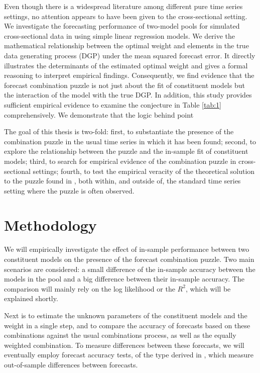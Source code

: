 \documentclass{monashthesis}
\begin{document}
Even though there is a widespread literature among different pure time series settings, no attention appears to have been given to the cross-sectional setting. We investigate the forecasting performance of two-model pools for simulated cross-sectional data in using simple linear regression models. We derive the mathematical relationship between the optimal weight and elements in the true data generating process (DGP) under the mean squared forecast error. It directly illustrates the determinants of the estimated optimal weight and gives a formal reasoning to interpret empirical findings. Consequently, we find evidence that the forecast combination puzzle is not just about the fit of constituent models but the interaction of the model with the true DGP. In addition, this study provides sufficient empirical evidence to examine the conjecture in Table \ref{tab:1} comprehensively. We demonstrate that the logic behind point

The goal of this thesis is two-fold: first, to substantiate the presence of the combination puzzle in the usual time series in which it has been found; second, to explore the relationship between the puzzle and the in-sample fit of constituent models; third, to search for empirical evidence of the combination puzzle in cross-sectional settings; fourth, to test the empirical veracity of the theoretical solution to the puzzle found in \textcite{FZMP23}, both within, and outside of, the standard time series setting where the puzzle is often observed.

\hypertarget{method}{%
\chapter{Methodology}\label{method}}

We will empirically investigate the effect of in-sample performance between two constituent models on the presence of the forecast combination puzzle. Two main scenarios are considered: a small difference of the in-sample accuracy between the models in the pool and a big difference between their in-sample accuracy. The comparison will mainly rely on the log likelihood or the \(R^2\), which will be explained shortly.

Next is to estimate the unknown parameters of the constituent models and the weight in a single step, and to compare the accuracy of forecasts based on these combinations against the usual combinations process, as well as the equally weighted combination. To measure differences between these forecasts, we will eventually employ forecast accuracy tests, of the type derived in \textcite{W96}, which measure out-of-sample differences between forecasts.
\end{document}

